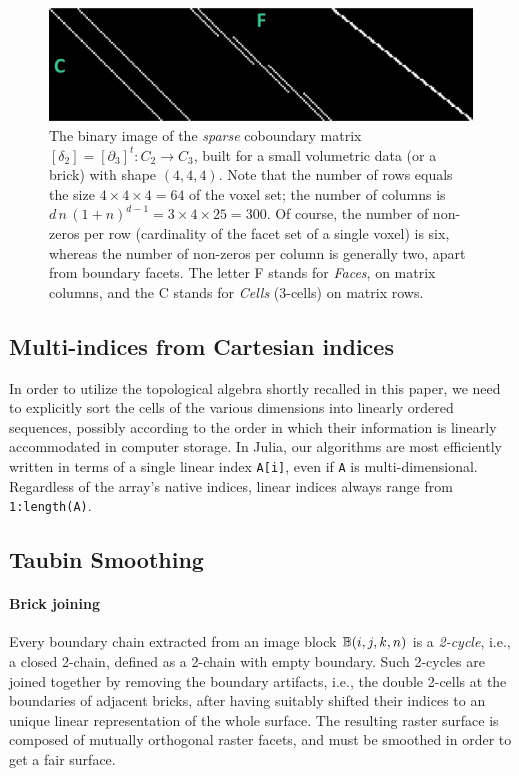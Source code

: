 \begin{figure}[tbp] %
   \centering
   \includegraphics[width=0.75\linewidth]{figs/boundary_matrix_4x4x4_desc.png} 
   \caption{
   The binary image of the \emph{sparse} coboundary matrix  $\left[\delta_2\right] = \left[\partial_3\right]^t : C_2 \to C_3$,
   built for a small volumetric data (or a brick) with shape $(4,4,4)$. Note that the number of rows equals the size $4\times 4\times 4 = 64$ of the voxel set; the number of columns is $d\,n\,(1+n)^{d-1} = 3\times 4\times 25 = 300$. Of course, the number of non-zeros per row (cardinality of the facet set of a single voxel) is six, whereas the number of non-zeros per column is generally two, apart from boundary facets. The letter F stands for \emph{Faces}, on matrix columns, and the C stands for \emph{Cells} (3-cells) on matrix rows.}
   \label{fig:boundary_matrix_4x4x4}
\end{figure}

\subsection{Multi-indices from Cartesian indices}\label{sec:inds-from-cart}

In order to utilize the topological algebra shortly recalled in this paper, we need to explicitly sort the cells of the various dimensions into linearly ordered sequences, possibly according to the order in which their information is linearly accommodated in computer storage. In Julia, our algorithms are most efficiently written in terms of a single linear index \texttt{A[i]}, even if \texttt{A} is multi-dimensional. Regardless of the array's native indices, linear indices always range from \texttt{1:length(A)}. 

\subsection{Taubin Smoothing}\label{sec:taubin}

\paragraph{Brick joining}
Every boundary chain extracted from an image block $\mathbb{B}(i,j,k,n)$ is a \emph{2-cycle}, i.e., a closed 2-chain, defined as a 2-chain with empty boundary. Such 2-cycles are joined together by removing the boundary artifacts, i.e., the double 2-cells at the boundaries of adjacent bricks, after having suitably shifted their indices to an unique linear representation of the whole surface. 
The resulting raster surface is composed of mutually orthogonal raster facets, and must be smoothed in order to get a fair surface. 


